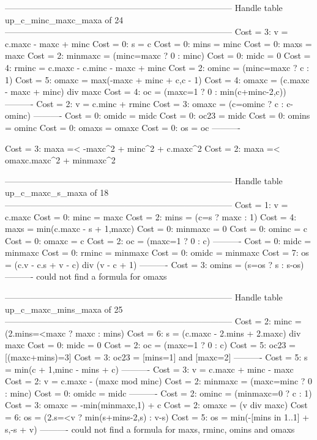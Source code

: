 --------------------------------------------------------------------------------
Handle table up_c_minc_maxc_maxa of 24
--------------------------------------------------------------------------------
Cost =  3:  v       = c.maxc - maxc + minc
Cost =  0:  s       = c
Cost =  0:  mins    = minc
Cost =  0:  maxs    = maxc
Cost =  2:  minmaxc = (minc=maxc ? 0 : minc)
Cost =  0:  midc    = 0
Cost =  4:  rminc   = c.maxc - c.minc - maxc + minc
Cost =  2:  ominc   = (minc=maxc ? c : 1)
Cost =  5:  omaxc   = max(-maxc + minc + c,c - 1)
Cost =  4:  omaxc   = (c.maxc - maxc + minc) div maxc
Cost =  4:  oc      = (maxc=1 ? 0 : min(c+minc-2,c))
----------
Cost =  2:  v       = c.minc + rminc
Cost =  3:  omaxc   = (c=ominc ? c : c-ominc)
----------
Cost =  0:  omidc   = midc
Cost =  0:  oc23    = midc
Cost =  0:  omins   = ominc
Cost =  0:  omaxs   = omaxc
Cost =  0:  os      = oc
----------

Cost =  3:  maxa =< -maxc^2 + minc^2 + c.maxc^2
Cost =  2:  maxa =< omaxc.maxc^2 + minmaxc^2

--------------------------------------------------------------------------------
Handle table up_c_maxc_s_maxa of 18
--------------------------------------------------------------------------------
Cost =  1:  v       = c.maxc
Cost =  0:  minc    = maxc
Cost =  2:  mins    = (c=s ? maxc : 1)
Cost =  4:  maxs    = min(c.maxc - s + 1,maxc)
Cost =  0:  minmaxc = 0
Cost =  0:  ominc   = c
Cost =  0:  omaxc   = c
Cost =  2:  oc      = (maxc=1 ? 0 : c)
----------
Cost =  0:  midc    = minmaxc
Cost =  0:  rminc   = minmaxc
Cost =  0:  omidc   = minmaxc
Cost =  7:  os      = (c.v - c.s + v - c) div (v - c + 1)
----------
Cost =  3:  omins   = (s=os ? s : s-os)
----------
could not find a formula for omaxs


--------------------------------------------------------------------------------
Handle table up_c_maxc_mins_maxa of 25
--------------------------------------------------------------------------------
Cost =  2:  minc    = (2.mins=<maxc ? maxc : mins)
Cost =  6:  s       = (c.maxc - 2.mins + 2.maxc) div maxc
Cost =  0:  midc    = 0
Cost =  2:  oc      = (maxc=1 ? 0 : c)
Cost =  5:  oc23    = [(maxc+mins)=3]
Cost =  3:  oc23    = [mins=1] and [maxc=2]
----------
Cost =  5:  s       = min(c + 1,minc - mins + c)
----------
Cost =  3:  v       = c.maxc + minc - maxc
Cost =  2:  v       = c.maxc - (maxc mod minc)
Cost =  2:  minmaxc = (maxc=minc ? 0 : minc)
Cost =  0:  omidc   = midc
----------
Cost =  2:  ominc   = (minmaxc=0 ? c : 1)
Cost =  3:  omaxc   = -min(minmaxc,1) + c
Cost =  2:  omaxc   = (v div maxc)
Cost =  6:  os      = (2.s=<v ? min(s+mins-2,s) : v-s)
Cost =  5:  os      = min(-[mins in 1..1] + s,-s + v)
----------
could not find a formula for maxs, rminc, omins and omaxs

